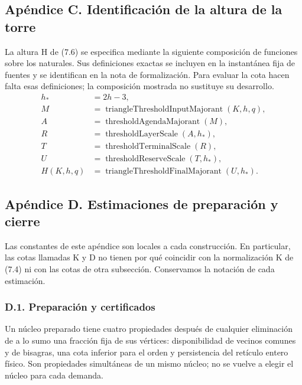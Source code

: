 \documentclass[spanish,11pt,a4paper]{article}
\begin{document}
\subsection{Apéndice C. Identificación de la altura de la torre}\label{apuxe9ndice-c.-identificaciuxf3n-de-la-altura-de-la-torre}

La altura H de (7.6) se especifica mediante la siguiente composición de funciones sobre los naturales. Sus definiciones exactas se incluyen en la instantánea fija de fuentes y se identifican en la nota de formalización. Para evaluar la cota hacen falta esas definiciones; la composición mostrada no sustituye su desarrollo.
\[\begin{aligned}
h_*&=2h-3,\\
M&=\operatorname{triangleThresholdInputMajorant}(K,h,q),\\
A&=\operatorname{thresholdAgendaMajorant}(M),\\
R&=\operatorname{thresholdLayerScale}(A,h_*),\\
T&=\operatorname{thresholdTerminalScale}(R),\\
U&=\operatorname{thresholdReserveScale}(T,h_*),\\
H(K,h,q)&=\operatorname{triangleThresholdFinalMajorant}(U,h_*).
\end{aligned}                                                       \tag{C.1}\]

\subsection{Apéndice D. Estimaciones de preparación y cierre}\label{apuxe9ndice-d.-estimaciones-de-preparaciuxf3n-y-cierre}

Las constantes de este apéndice son locales a cada construcción. En particular, las cotas llamadas K y D no tienen por qué coincidir con la normalización K de (7.4) ni con las cotas de otra subsección. Conservamos la notación de cada estimación.

\subsubsection{D.1. Preparación y certificados}\label{d.1.-preparaciuxf3n-y-certificados}

Un núcleo preparado tiene cuatro propiedades después de cualquier eliminación de a lo sumo una fracción fija de sus vértices: disponibilidad de vecinos comunes y de bisagras, una cota inferior para el orden y persistencia del retículo entero físico. Son propiedades simultáneas de un mismo núcleo; no se vuelve a elegir el núcleo para cada demanda.
\end{document}
